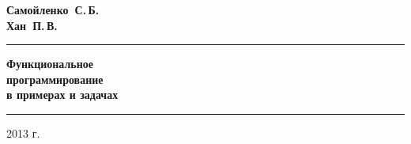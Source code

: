 \newcommand{\titlefont}{\color{red!30!black}\bfseries}

\begin{flushright}
\thispagestyle{empty}

\vspace{1cm}
\Large
\textbf{Самойленко~С.\,Б.}\\
\textbf{Хан~П.\,В.}
\normalfont

\vspace{2cm}

\hrule
\bigskip
           \HUGE\titlefont
            Функциональное\\
            программирование\\
            \huge\normalcolor\normalfont
            в примерах и задачах
\bigskip
\hrule
\vspace{2cm}
    

\vfill
\normalsize
2013 г.

\end{flushright}
